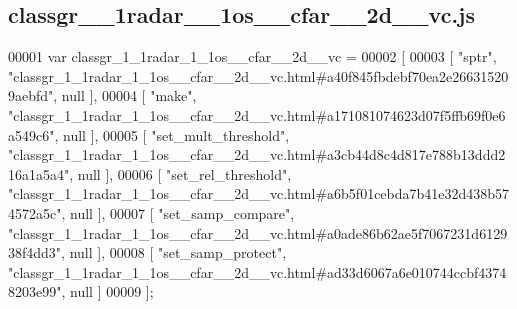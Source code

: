 \subsection{classgr\+\_\+\_\+1radar\+\_\+\_\+1os\+\_\+\+\_\+cfar\+\_\+\+\_\+2d\+\_\+\+\_\+vc.\+js}
\label{classgr__1__1radar__1__1os____cfar____2d____vc_8js_source}

\begin{DoxyCode}
00001 var classgr_1_1radar_1_1os__cfar__2d__vc =
00002 [
00003     [ \textcolor{stringliteral}{"sptr"}, \textcolor{stringliteral}{"classgr\_1\_1radar\_1\_1os\_\_cfar\_\_2d\_\_vc.html#a40f845fbdebf70ea2e266315209aebfd"}, null ],
00004     [ \textcolor{stringliteral}{"make"}, \textcolor{stringliteral}{"classgr\_1\_1radar\_1\_1os\_\_cfar\_\_2d\_\_vc.html#a171081074623d07f5ffb69f0e6a549c6"}, null ],
00005     [ \textcolor{stringliteral}{"set\_mult\_threshold"}, \textcolor{stringliteral}{"classgr\_1\_1radar\_1\_1os\_\_cfar\_\_2d\_\_vc.html#a3cb44d8c4d817e788b13ddd216a1a5a4"}, 
      null ],
00006     [ \textcolor{stringliteral}{"set\_rel\_threshold"}, \textcolor{stringliteral}{"classgr\_1\_1radar\_1\_1os\_\_cfar\_\_2d\_\_vc.html#a6b5f01cebda7b41e32d438b574572a5c"}, 
      null ],
00007     [ \textcolor{stringliteral}{"set\_samp\_compare"}, \textcolor{stringliteral}{"classgr\_1\_1radar\_1\_1os\_\_cfar\_\_2d\_\_vc.html#a0ade86b62ae5f7067231d612938f4dd3"}, 
      null ],
00008     [ \textcolor{stringliteral}{"set\_samp\_protect"}, \textcolor{stringliteral}{"classgr\_1\_1radar\_1\_1os\_\_cfar\_\_2d\_\_vc.html#ad33d6067a6e010744ccbf43748203e99"}, 
      null ]
00009 ];
\end{DoxyCode}
